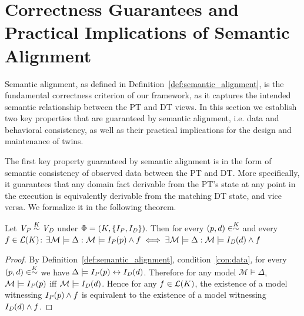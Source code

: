 \section{Correctness Guarantees and Practical Implications of Semantic Alignment}\label{sec:guarantees}


Semantic alignment, as defined in Definition~\ref{def:semantic_alignment}, is the fundamental correctness criterion of our framework, as it captures the intended semantic relationship between the PT and DT views. In this section we establish two key properties that are guaranteed by semantic alignment, i.e. data and behavioral consistency, as well as their practical implications for the design and maintenance of twins. 




The first key property guaranteed by semantic alignment is in the form of semantic consistency of observed data between the PT and DT. More specifically, it guarantees that any domain fact derivable from the PT's state at any point in the execution is equivalently derivable from the matching DT state, and vice versa. We formalize it in the following theorem.  




\begin{theorem}
\label{thm:data-consistency}
Let $\mathit{V_P}\stackrel{K}{\sim}\mathit{V_D}$ under 
$\Phi = (K, \{I_{\mathit{P}}, 
I_{\mathit{D}}\})$. Then for every $(p, d) \in \stackrel{K}{\sim}$ and every
$f \in \mathcal{L}(K)$: $\exists \mathcal{M} \models \Delta : \mathcal{M} \models 
I_{\mathit{P}}(p) \wedge f \iff 
\exists \mathcal{M} \models \Delta : \mathcal{M} \models 
I_{\mathit{D}}(d) \wedge f$
\end{theorem}
\begin{proof}
By Definition~\ref{def:semantic_alignment}, condition~\ref{con:data}, 
for every $(p, d) \in \stackrel{K}{\sim}$ we have $\Delta \models 
I_{\mathit{P}}(p) \leftrightarrow I_{\mathit{D}}(d)$. 
Therefore for any model $\mathcal{M} \models \Delta$, 
$\mathcal{M} \models I_{\mathit{P}}(p)$ iff 
$\mathcal{M} \models I_{\mathit{D}}(d)$. Hence for 
any $f \in \mathcal{L}(K)$, the existence of a model 
witnessing $I_{\mathit{P}}(p) \wedge f$ is 
equivalent to the existence of a model witnessing 
$I_{\mathit{D}}(d) \wedge f$.
\end{proof}


